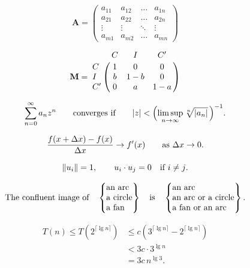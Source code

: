 \documentclass[11pt]{article}
\begin{document}

$$\mathbf{A} = \begin{pmatrix}a_{11}&a_{12}&\ldots&a_{1n}\\
a_{21}&a_{22}&\ldots&a_{2n}\\
\vdots&\vdots&\ddots&\vdots\\
a_{m1}&a_{m2}&\ldots&a_{mn}\end{pmatrix}$$

$$\mathbf{M}=\bordermatrix{&C&I&C'\cr
C&1&0&0\cr I&b&1-b&0\cr C'&0&a&1-a}$$


$$\sum_{n=0}^\infty a_nz^n\qquad\hbox{converges if}\qquad
|z|<\Bigl(\limsup_{n\to\infty}\root n\of{|a_n|}\,\Bigr)^{-1}.$$

$$\frac{f(x+\Delta x)-f(x)}{\Delta x}\to f'(x)
\qquad \hbox{as $\Delta x\to0$.}$$

$$\|u_i\|=1,\qquad u_i\cdot u_j=0\quad\hbox{if $i\ne j$.}$$


$$\it\hbox{The confluent image of}\quad
\begin{Bmatrix}\hbox{an arc}\hfill\\\hbox{a circle}\hfill\\
\hbox{a fan}\hfill\\\end{Bmatrix}
\quad\hbox{is}\quad
\begin{Bmatrix}\hbox{an arc}\hfill\\
\hbox{an arc or a circle}\hfill\\
\hbox{a fan or an arc}\hfill\end{Bmatrix}.$$


\begin{align*}
T(n)\le T(2^{\lceil\lg n\rceil})
&\le c(3^{\lceil\lg n\rceil}-2^{\lceil\lg n\rceil})\\
&<3c\cdot3^{\lg n}\\
&=3c\,n^{\lg3}.
\end{align*}

\end{document}
